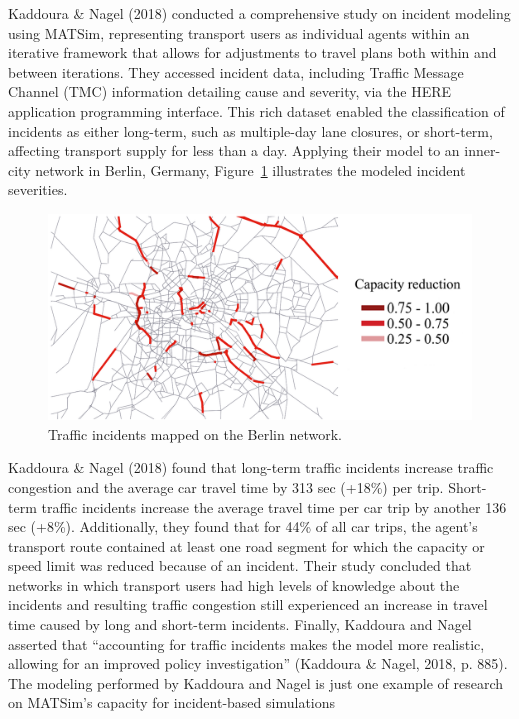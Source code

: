 \documentclass[fancy, oneside, mastersfancy, ms]{byuthesis}
\begin{document}
Kaddoura \& Nagel (2018) conducted a comprehensive study on incident
modeling using MATSim, representing transport users as individual agents
within an iterative framework that allows for adjustments to travel
plans both within and between iterations. They accessed incident data,
including Traffic Message Channel (TMC) information detailing cause and
severity, via the HERE application programming interface. This rich
dataset enabled the classification of incidents as either long-term,
such as multiple-day lane closures, or short-term, affecting transport
supply for less than a day. Applying their model to an inner-city
network in Berlin, Germany, Figure~\ref{fig-berlin_cap} illustrates the
modeled incident severities.

\begin{figure}

{\centering \includegraphics{figures/berlin_capacity.png}

}

\caption{\label{fig-berlin_cap}Traffic incidents mapped on the Berlin
network.}

\end{figure}

Kaddoura \& Nagel (2018) found that long-term traffic incidents increase
traffic congestion and the average car travel time by 313 sec (+18\%)
per trip. Short-term traffic incidents increase the average travel time
per car trip by another 136 sec (+8\%). Additionally, they found that
for 44\% of all car trips, the agent's transport route contained at
least one road segment for which the capacity or speed limit was reduced
because of an incident. Their study concluded that networks in which
transport users had high levels of knowledge about the incidents and
resulting traffic congestion still experienced an increase in travel
time caused by long and short-term incidents. Finally, Kaddoura and
Nagel asserted that ``accounting for traffic incidents makes the model
more realistic, allowing for an improved policy investigation''
(Kaddoura \& Nagel, 2018, p. 885). The modeling performed by Kaddoura
and Nagel is just one example of research on MATSim's capacity for
incident-based simulations
\end{document}
